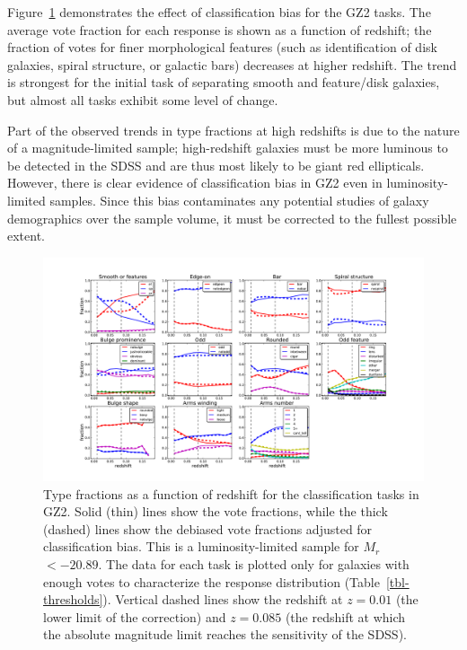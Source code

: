 \documentclass[useAMS,usenatbib]{mn2e}
\newcommand{\mr}{$M_r$}
\begin{document}
Figure~\ref{fig-type_fractions} demonstrates the effect of classification bias for the GZ2 tasks. The average vote fraction for each response is shown as a function of redshift; the fraction of votes for finer morphological features (such as identification of disk galaxies, spiral structure, or galactic bars) decreases at higher redshift. The trend is strongest for the initial task of separating smooth and feature/disk galaxies, but almost all tasks exhibit some level of change. 

Part of the observed trends in type fractions at high redshifts is due to the nature of a magnitude-limited sample; high-redshift galaxies must be more luminous to be detected in the SDSS and are thus most likely to be giant red ellipticals. However, there is clear evidence of classification bias in GZ2 even in luminosity-limited samples. Since this bias contaminates any potential studies of galaxy demographics over the sample volume, it must be corrected to the fullest possible extent. 

\begin{figure}
\includegraphics[angle=0,width=7.0in]{figures/gz2_type_fractions.pdf}
\caption{Type fractions as a function of redshift for the classification tasks in GZ2. Solid (thin) lines show the vote fractions, while the thick (dashed) lines show the debiased vote fractions adjusted for classification bias. This is a luminosity-limited sample for \mr~$<-20.89$. The data for each task is plotted only for galaxies with enough votes to characterize the response distribution (Table~\ref{tbl-thresholds}). Vertical dashed lines show the redshift at $z=0.01$ (the lower limit of the correction) and $z=0.085$ (the redshift at which the absolute magnitude limit reaches the sensitivity of the SDSS). 
\label{fig-type_fractions}}
\end{figure}
\end{document}
